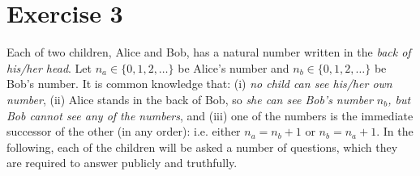 \documentclass[leqno]{article}
\begin{document}
\newpage

\section*{Exercise 3}
Each of two children, Alice and Bob, has a natural number written in the \textit{back of his/her head}. Let $n_a \in \{0, 1, 2, \dots\}$ be Alice's number and $n_b \in \{0, 1, 2, \dots\}$ be Bob's number. It is common knowledge that: (i) \textit{no child can see his/her own number}, (ii) Alice stands in the back of Bob, so \textit{she can see Bob's number $n_b$, but Bob cannot see any of the numbers}, and (iii) one of the numbers is the immediate successor of the other (in any order): i.e. either $n_a = n_b + 1$ or $n_b = n_a + 1$.
In the following, each of the children will be asked a number of questions, which they are required to answer publicly and truthfully.
\end{document}
